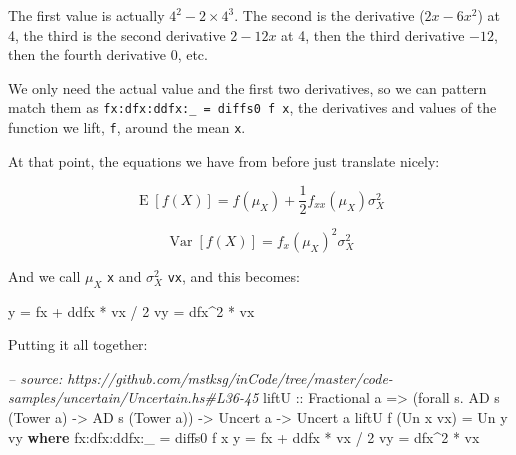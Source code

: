 \documentclass[]{article}
\newenvironment{Shaded}{}{}
\newcommand{\KeywordTok}[1]{\textcolor[rgb]{0.00,0.44,0.13}{\textbf{{#1}}}}
\newcommand{\DataTypeTok}[1]{\textcolor[rgb]{0.56,0.13,0.00}{{#1}}}
\newcommand{\DecValTok}[1]{\textcolor[rgb]{0.25,0.63,0.44}{{#1}}}
\newcommand{\CommentTok}[1]{\textcolor[rgb]{0.38,0.63,0.69}{\textit{{#1}}}}
\newcommand{\OtherTok}[1]{\textcolor[rgb]{0.00,0.44,0.13}{{#1}}}
\newcommand{\FunctionTok}[1]{\textcolor[rgb]{0.02,0.16,0.49}{{#1}}}
\newcommand{\NormalTok}[1]{{#1}}
\begin{document}
The first value is actually \(4^2 - 2 \times 4^3\). The second is the
derivative (\(2 x - 6x^2\)) at 4, the third is the second derivative
\(2 - 12 x\) at 4, then the third derivative \(-12\), then the fourth
derivative \(0\), etc.

We only need the actual value and the first two derivatives, so we can
pattern match them as \texttt{fx:dfx:ddfx:\_\ =\ diffs0\ f\ x}, the
derivatives and values of the function we lift, \texttt{f}, around the
mean \texttt{x}.

At that point, the equations we have from before just translate nicely:

\[
\operatorname{E}[f(X)] = f(\mu_X) + \frac{1}{2} f_{xx}(\mu_X) \sigma_X^2
\]

\[
\operatorname{Var}[f(X)] = f_x(\mu_X)^2 \sigma_X^2
\]

And we call \(\mu_X\) \texttt{x} and \(\sigma_X^2\) \texttt{vx}, and
this becomes:

\begin{Shaded}
\begin{Highlighting}[]
\NormalTok{y  }\FunctionTok{=} \NormalTok{fx }\FunctionTok{+} \NormalTok{ddfx }\FunctionTok{*} \NormalTok{vx }\FunctionTok{/} \DecValTok{2}
\NormalTok{vy }\FunctionTok{=} \NormalTok{dfx}\FunctionTok{^}\DecValTok{2} \FunctionTok{*} \NormalTok{vx}
\end{Highlighting}
\end{Shaded}

Putting it all together:

\begin{Shaded}
\begin{Highlighting}[]
\CommentTok{-- source: https://github.com/mstksg/inCode/tree/master/code-samples/uncertain/Uncertain.hs#L36-45}
\NormalTok{liftU}
\OtherTok{    ::} \DataTypeTok{Fractional} \NormalTok{a}
    \OtherTok{=>} \NormalTok{(forall s}\FunctionTok{.} \DataTypeTok{AD} \NormalTok{s (}\DataTypeTok{Tower} \NormalTok{a) }\OtherTok{->} \DataTypeTok{AD} \NormalTok{s (}\DataTypeTok{Tower} \NormalTok{a))}
    \OtherTok{->} \DataTypeTok{Uncert} \NormalTok{a}
    \OtherTok{->} \DataTypeTok{Uncert} \NormalTok{a}
\NormalTok{liftU f (}\DataTypeTok{Un} \NormalTok{x vx) }\FunctionTok{=} \DataTypeTok{Un} \NormalTok{y vy}
  \KeywordTok{where}
    \NormalTok{fx}\FunctionTok{:}\NormalTok{dfx}\FunctionTok{:}\NormalTok{ddfx}\FunctionTok{:}\NormalTok{_ }\FunctionTok{=} \NormalTok{diffs0 f x}
    \NormalTok{y             }\FunctionTok{=} \NormalTok{fx }\FunctionTok{+} \NormalTok{ddfx }\FunctionTok{*} \NormalTok{vx }\FunctionTok{/} \DecValTok{2}
    \NormalTok{vy            }\FunctionTok{=} \NormalTok{dfx}\FunctionTok{^}\DecValTok{2} \FunctionTok{*} \NormalTok{vx}
\end{Highlighting}
\end{Shaded}
\end{document}
